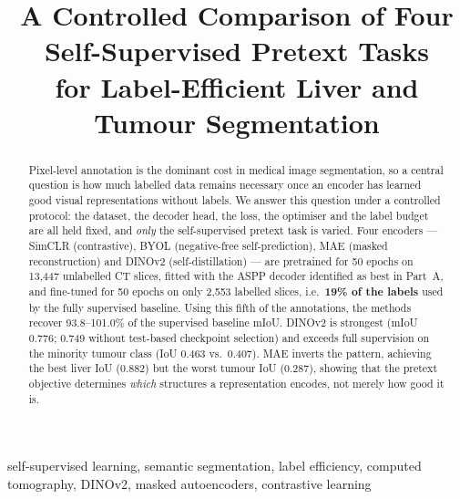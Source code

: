 \documentclass[conference]{IEEEtran}
\begin{document}
\title{A Controlled Comparison of Four Self-Supervised Pretext Tasks\\
for Label-Efficient Liver and Tumour Segmentation}

\author{
}

\maketitle

\begin{abstract}
Pixel-level annotation is the dominant cost in medical image segmentation, so a
central question is how much labelled data remains necessary once an encoder has
learned good visual representations without labels. We answer this question under
a controlled protocol: the dataset, the decoder head, the loss, the optimiser and
the label budget are all held fixed, and \emph{only} the self-supervised pretext
task is varied. Four encoders --- SimCLR (contrastive), BYOL (negative-free
self-prediction), MAE (masked reconstruction) and DINOv2 (self-distillation) ---
are pretrained for 50 epochs on 13{,}447 unlabelled CT slices, fitted with the
ASPP decoder identified as best in Part~A, and fine-tuned for 50 epochs on only
2{,}553 labelled slices, i.e.\ \textbf{19\% of the labels} used by the fully
supervised baseline. Using this fifth of the annotations, the methods recover
93.8--101.0\% of the supervised baseline mIoU. DINOv2 is strongest (mIoU 0.776;
0.749 without test-based checkpoint selection) and exceeds full supervision on
the minority tumour class (IoU 0.463 vs.\ 0.407). MAE inverts the pattern,
achieving the best liver IoU (0.882) but the worst tumour IoU (0.287), showing
that the pretext objective determines \emph{which} structures a representation
encodes, not merely how good it is.
\end{abstract}

\begin{IEEEkeywords}
self-supervised learning, semantic segmentation, label efficiency, computed
tomography, DINOv2, masked autoencoders, contrastive learning
\end{IEEEkeywords}
\end{document}
